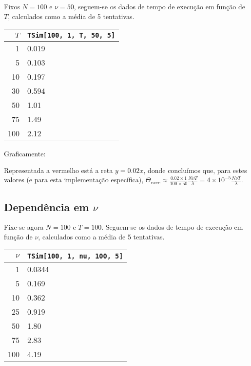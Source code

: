 \documentclass{article}
\begin{document}
	Fixos $N = 100$ e $\nu = 50$, seguem-se os dados de tempo de execução em função de $T$, calculados como a média de 5 tentativas.
	
	\begin{tabular}{r | l}
	$T$ & \texttt{TSim[100, 1, T, 50, 5]} \\
	\hline
	1 & 0.019 \\
	5 & 0.103\\
	10 & 0.197\\
	30 & 0.594 \\
	50 & 1.01 \\
	75 & 1.49 \\
	100 & 2.12
	\end{tabular}
	
	Graficamente:
	

	Representada a vermelho está a reta $y = 0.02x$, donde concluímos que, para estes valores (e para esta implementação específica), $\Theta_{exec} \approx \frac{0.02 \times 1}{100 \times 50} \frac{N \nu T}\lambda = 4 \times 10^{-5} \frac{N \nu T}\lambda$.
	
	\subsection{Dependência em $\nu$}
	
	Fixe-se agora $N = 100$ e $T = 100$. Seguem-se os dados de tempo de execução em função de $\nu$, calculados como a média de 5 tentativas.
	
	\begin{tabular}{r | l}
	$\nu$ & \texttt{TSim[100, 1, nu, 100, 5]} \\
	\hline
	1 & 0.0344 \\
	5 & 0.169 \\
	10 & 0.362 \\
	25 & 0.919 \\
	50 & 1.80 \\
	75 & 2.83 \\
	100 & 4.19
	\end{tabular}
	
\end{document}
